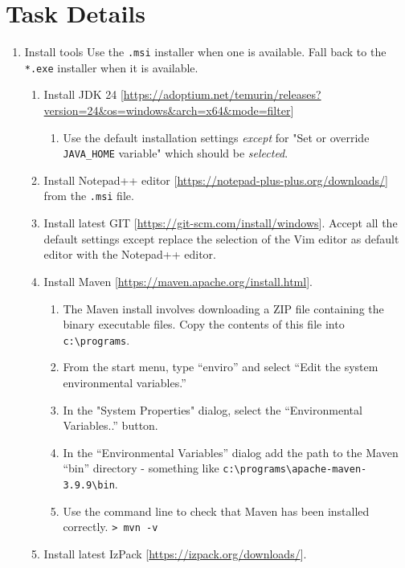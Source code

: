 \documentclass{article}
\begin{document}
\section{Task Details}
\begin{enumerate}
    \item Install tools
    Use the \verb|.msi| installer when one is available.  Fall back to the \verb|*.exe| installer when it is available.
    \begin{enumerate}
        \item Install JDK 24 [\url{https://adoptium.net/temurin/releases?version=24&os=windows&arch=x64&mode=filter}]
        \begin{enumerate}
            \item Use the default installation settings \emph{except} for "Set or override \verb|JAVA_HOME| variable" which should be \emph{selected}.
        \end{enumerate}
        \item Install Notepad++ editor [\url{https://notepad-plus-plus.org/downloads/}] from the \verb|.msi| file.
        \item Install latest GIT [\url{https://git-scm.com/install/windows}].  Accept all the default settings except replace the selection of the Vim editor as default editor with the Notepad++ editor.
        \item Install Maven [\url{https://maven.apache.org/install.html}].
        \begin{enumerate}
            \item The Maven install involves downloading a ZIP file containing the binary executable files.  Copy the contents of this file into \verb|c:\programs|.  
            \item From the start menu, type ``enviro'' and select ``Edit the system environmental variables.''
            \item In the "System Properties" dialog, select the ``Environmental Variables..'' button.
            \item In the ``Environmental Variables'' dialog add the path to the Maven ``bin'' directory - something like \verb|c:\programs\apache-maven-3.9.9\bin|.
            \item Use the command line to check that Maven has been installed correctly. \verb|> mvn -v|
        \end{enumerate}
        \item Install latest IzPack [\url{https://izpack.org/downloads/}].
        \begin{enumerate}

\end{enumerate}
\end{enumerate}
\end{enumerate}
\end{document}
